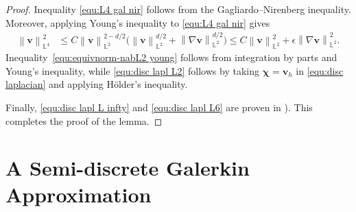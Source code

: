 \documentclass[11pt, reqno]{amsart}
\theoremstyle{definition}
\theoremstyle{remark}
\numberwithin{equation}{section}
\newcommand{\bff}{\boldsymbol}
\newcommand{\bb}{\mathbb}
\newcommand{\norm}[2]{\left\|{#1}\right\|_{#2}}
\begin{document}
\begin{proof}
	Inequality \eqref{equ:L4 gal nir} follows from the Gagliardo--Nirenberg inequality. Moreover, applying Young's inequality to \eqref{equ:L4 gal nir} gives
	\begin{align*}
		\norm{\bff{v}}{\bb{L}^4}^2
		&\leq
		C \norm{\bff{v}}{\bb{L}^2}^{2-d/2}
		\big( \norm{\bff{v}}{\bb{L}^2}^{d/2}
		+
		\norm{\nabla \bff{v}}{\bb{L}^2}^{d/2} \big)
		\leq 
		C \norm{\bff{v}}{\bb{L}^2}^2
		+
		\epsilon \norm{\nabla \bff{v}}{\bb{L}^2}^2.
	\end{align*}
	Inequality~\eqref{equ:equivnorm-nabL2 young} follows from integration by parts and Young's inequality, while \eqref{equ:disc lapl L2} follows by taking $\bff{\chi}=\bff{v}_h$ in \eqref{equ:disc laplacian} and applying H\"older's inequality.
	
	Finally, \eqref{equ:disc lapl L infty} and \eqref{equ:disc lapl L6} are proven in \cite[Appendix A]{GuiLiWan22}). This completes the proof of the lemma.
\end{proof}



\section{A Semi-discrete Galerkin Approximation}\label{sec:semidiscrete}
\end{document}
